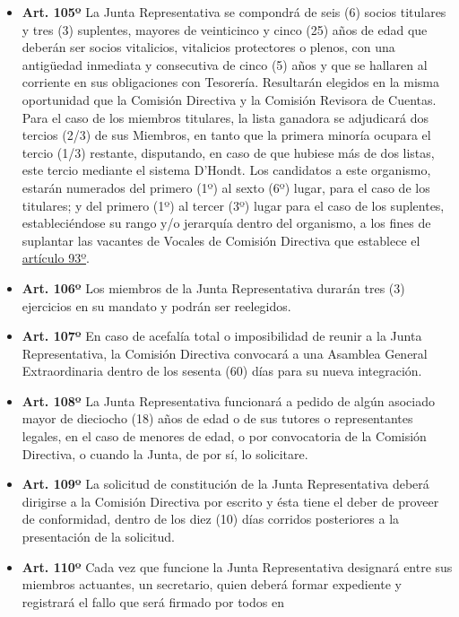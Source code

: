 \documentclass[]{book}
\begin{document}
\begin{itemize}
\item
  \textbf{Art. 105º} La Junta Representativa se compondrá de seis (6)
  socios titulares y tres (3) suplentes, mayores de veinticinco y cinco
  (25) años de edad que deberán ser socios vitalicios, vitalicios
  protectores o plenos, con una antigüedad inmediata y consecutiva de
  cinco (5) años y que se hallaren al corriente en sus obligaciones con
  Tesorería. Resultarán elegidos en la misma oportunidad que la Comisión
  Directiva y la Comisión Revisora de Cuentas. Para el caso de los
  miembros titulares, la lista ganadora se adjudicará dos tercios (2/3)
  de sus Miembros, en tanto que la primera minoría ocupara el tercio
  (1/3) restante, disputando, en caso de que hubiese más de dos listas,
  este tercio mediante el sistema D'Hondt. Los candidatos a este
  organismo, estarán numerados del primero (1º) al sexto (6º) lugar,
  para el caso de los titulares; y del primero (1º) al tercer (3º) lugar
  para el caso de los suplentes, estableciéndose su rango y/o jerarquía
  dentro del organismo, a los fines de suplantar las vacantes de Vocales
  de Comisión Directiva que establece el
  \protect\hyperlink{art93}{artículo 93º}.
\item
  \textbf{Art. 106º} Los miembros de la Junta Representativa durarán
  tres (3) ejercicios en su mandato y podrán ser reelegidos.
\item
  \textbf{Art. 107º} En caso de acefalía total o imposibilidad de reunir
  a la Junta Representativa, la Comisión Directiva convocará a una
  Asamblea General Extraordinaria dentro de los sesenta (60) días para
  su nueva integración.
\item
  \textbf{Art. 108º} La Junta Representativa funcionará a pedido de
  algún asociado mayor de dieciocho (18) años de edad o de sus tutores o
  representantes legales, en el caso de menores de edad, o por
  convocatoria de la Comisión Directiva, o cuando la Junta, de por sí,
  lo solicitare.
\item
  \textbf{Art. 109º} La solicitud de constitución de la Junta
  Representativa deberá dirigirse a la Comisión Directiva por escrito y
  ésta tiene el deber de proveer de conformidad, dentro de los diez (10)
  días corridos posteriores a la presentación de la solicitud.
\item
  \textbf{Art. 110º} Cada vez que funcione la Junta Representativa
  designará entre sus miembros actuantes, un secretario, quien deberá
  formar expediente y registrará el fallo que será firmado por todos en

\end{itemize}
\end{document}

